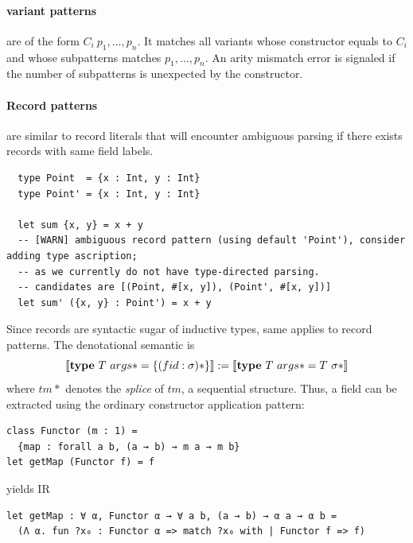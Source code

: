 \documentclass[a4paper, 11pt]{article}
\theoremstyle{remark}\newtheorem*{remark}{Remark}
\theoremstyle{definition}\newtheorem*{definition}{Definition}
\begin{document}
\paragraph{variant patterns} are of the form \(C_i\ p_1,\dots,p_n\). It
matches all variants whose constructor equals to \(C_i\) and whose subpatterns matches \(p_1,\dots,p_n\).
An arity mismatch error is signaled if the number of subpatterns is unexpected by the constructor.
\paragraph{Record patterns} are similar to record literals that will encounter
ambiguous parsing if there exists records with same field labels.
\begin{verbatim}
  type Point  = {x : Int, y : Int}
  type Point' = {x : Int, y : Int}

  let sum {x, y} = x + y
  -- [WARN] ambiguous record pattern (using default 'Point'), consider adding type ascription;
  -- as we currently do not have type-directed parsing.
  -- candidates are [(Point, #[x, y]), (Point', #[x, y])]
  let sum' ({x, y} : Point') = x + y
\end{verbatim}
Since records are syntactic sugar of inductive types, same applies to record patterns. The denotational semantic is
\[
  \llbracket \textbf{type}\ T\ args* = \{(fid : \sigma)*\} \rrbracket :=
  \llbracket \textbf{type}\ T\ args* = T\ \sigma* \rrbracket
\]
where \(tm*\) denotes the \emph{splice} of \(tm\), a sequential structure. Thus, a field can be
extracted using the ordinary constructor application pattern:
\begin{verbatim}
class Functor (m : 1) =
  {map : forall a b, (a → b) → m a → m b}
let getMap (Functor f) = f
\end{verbatim}
yields IR
\begin{verbatim}
let getMap : ∀ α, Functor α → ∀ a b, (a → b) → α a → α b =
  (Λ α. fun ?x₀ : Functor α => match ?x₀ with | Functor f => f)
\end{verbatim}
\end{document}
